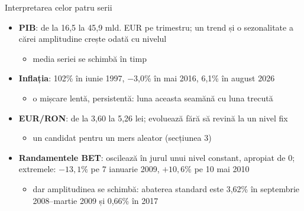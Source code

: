 \begin{frame}{Interpretarea celor patru serii}
\itemsize{\small}
\begin{itemize}
    \item \textbf{PIB}: de la 16{,}5 la 45{,}9 mld. EUR pe trimestru; un trend și o sezonalitate a cărei amplitudine crește odată cu nivelul
    \begin{itemize}
        \item media seriei se schimbă în timp
    \end{itemize}
    \item \textbf{Inflația}: 102\% în iunie 1997, \ensuremath{-}3{,}0\% în mai 2016, 6{,}1\% în august 2026
    \begin{itemize}
        \item o mișcare lentă, persistentă: luna aceasta seamănă cu luna trecută
    \end{itemize}
    \item \textbf{EUR/RON}: de la 3{,}60 la 5{,}26 lei; evoluează fără să revină la un nivel fix
    \begin{itemize}
        \item un candidat pentru un mers aleator (secțiunea 3)
    \end{itemize}
    \item \textbf{Randamentele BET}: oscilează în jurul unui nivel constant, apropiat de 0; extremele: $\ensuremath{-}13{,}1\%$ pe 7 ianuarie 2009, $+10{,}6\%$ pe 10 mai 2010
    \begin{itemize}
        \item dar amplitudinea se schimbă: abaterea standard este 3{,}62\% în septembrie 2008--martie 2009 și 0{,}66\% în 2017
    \end{itemize}
\end{itemize}
\end{frame}

